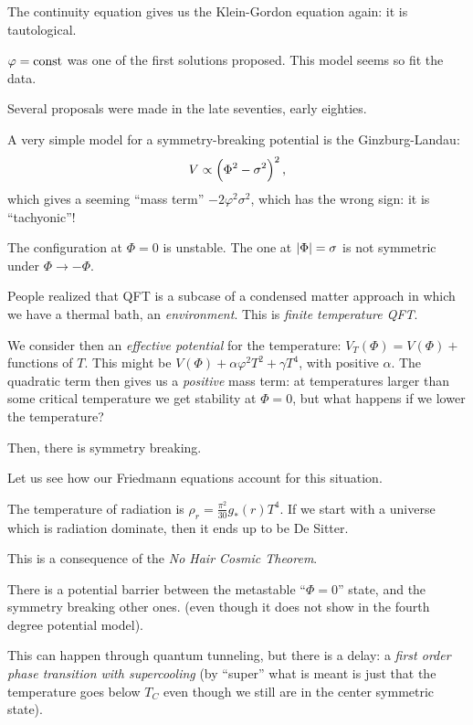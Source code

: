 \documentclass[main.tex]{subfiles}
\begin{document}
The continuity equation gives us the Klein-Gordon equation again: it is tautological.

\(\varphi = \text{const}\) was one of the first solutions proposed.
This model seems so fit the data.

Several proposals were made in the late seventies, early eighties.

A very simple model for a symmetry-breaking potential is the Ginzburg-Landau:
%
\begin{align}
  V \propto \qty(\Phi^2 - \sigma^2)^2
\,,
\end{align}
%
which gives a seeming ``mass term'' \(- 2 \varphi^2 \sigma^2\), which has the wrong sign: it is ``tachyonic''!

The configuration at \(\Phi = 0\) is unstable. The one at \(\abs{\Phi } = \sigma \) is not symmetric under \(\Phi \rightarrow - \Phi \).

People realized that QFT is a subcase of a condensed matter approach in which we have a thermal bath, an \emph{environment}.
This is \emph{finite temperature QFT}.

We consider then an \emph{effective potential} for the temperature: \(V_T (\Phi ) = V(\Phi ) + \) functions of \(T\).
This might be \(V(\Phi ) + \alpha \varphi^2 T^2 + \gamma T^{4}\), with positive \(\alpha \). The quadratic term then gives us a \emph{positive} mass term: at temperatures larger than some critical temperature we get stability at \(\Phi = 0\), but what happens if we lower the temperature?

Then, there is symmetry breaking.

Let us see how our Friedmann equations account for this situation.

The temperature of radiation is \(\rho _r  = \frac{\pi^2}{30 } g_{*} (r) T^{4}\). If we start with a universe which is radiation dominate, then it ends up to be De Sitter.

This is a consequence of the \emph{No Hair Cosmic Theorem}.

There is a potential barrier between the metastable ``\(\Phi = 0\)'' state, and the symmetry breaking other ones.
(even though it does not show in the fourth degree potential model).

This can happen through quantum tunneling, but there is a delay: a \emph{first order phase transition with supercooling} (by ``super'' what is meant is just that the temperature goes below \(T_C\) even though we still are in the center symmetric state).
\end{document}
